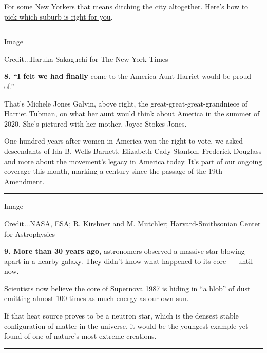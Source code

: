 For some New Yorkers that means ditching the city altogether.
\href{https://www.nytimes3xbfgragh.onion/2020/08/07/realestate/coronavirus-escape-suburbs-new-york.html}{Here's
how to pick which suburb is right for you}.

\begin{center}\rule{0.5\linewidth}{\linethickness}\end{center}

Image

Credit...Haruka Sakaguchi for The New York Times

\textbf{8. ``I felt we had finally} come to the America Aunt Harriet
would be proud of.''

That's Michele Jones Galvin, above right, the
great-great-great-grandniece of Harriet Tubman, on what her aunt would
think about America in the summer of 2020. She's pictured with her
mother, Joyce Stokes Jones.

One hundred years after women in America won the right to vote, we asked
descendants of Ida B. Wells-Barnett, Elizabeth Cady Stanton, Frederick
Douglass and more about
t\href{https://www.nytimes3xbfgragh.onion/interactive/2020/08/07/us/suffragists-descendants.html?}{he
movement's legacy in America today}. It's part of our ongoing coverage
this month, marking a century since the passage of the 19th Amendment.

\begin{center}\rule{0.5\linewidth}{\linethickness}\end{center}

Image

Credit...NASA, ESA; R. Kirshner and M. Mutchler; Harvard-Smithsonian
Center for Astrophysics

\textbf{9. More than 30 years ago,} astronomers observed a massive star
blowing apart in a nearby galaxy. They didn't know what happened to its
core --- until now.

Scientists now believe the core of Supernova 1987 is
\href{https://www.nytimes3xbfgragh.onion/2020/08/07/science/supernova-neutron-star-sn1987a.html}{hiding
in ``a blob'' of dust} emitting almost 100 times as much energy as our
own sun.

If that heat source proves to be a neutron star, which is the densest
stable configuration of matter in the universe, it would be the youngest
example yet found of one of nature's most extreme creations.

\begin{center}\rule{0.5\linewidth}{\linethickness}\end{center}

